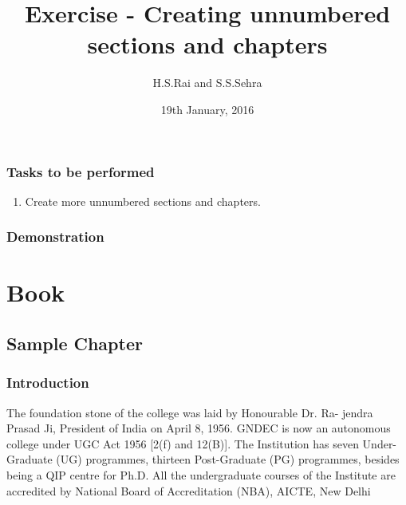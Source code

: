 \documentclass[a4paper,12pt,twoside]{book}
\title{Exercise - Creating  unnumbered sections and chapters}
\author{H.S.Rai and S.S.Sehra}
\date{19th January, 2016}
\begin{document}
	\maketitle	
	\section*{Tasks to be performed}
	\begin{enumerate}	
		\item Create more unnumbered sections and chapters.
	\end{enumerate}
	\section*{Demonstration}
	\part*{Book}
\chapter*{Sample Chapter}
\section*{Introduction}
The foundation stone of the college was laid by Honourable Dr. Ra-
jendra Prasad Ji, President of India on April 8, 1956. GNDEC is now an
autonomous college under UGC Act 1956 [2(f) and 12(B)]. The Institution
has seven Under-Graduate (UG) programmes, thirteen Post-Graduate (PG)
programmes, besides being a QIP centre for Ph.D. All the undergraduate
courses of the Institute are accredited by National Board of Accreditation
(NBA), AICTE, New Delhi
\end{document}
